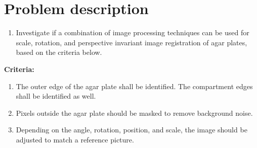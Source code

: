 \section{Problem description}
\begin{enumerate}
    \item Investigate if a combination of image processing techniques can be used for scale, rotation, and perspective invariant image registration of agar plates, based on the criteria below. 
    
\end{enumerate}
\textbf{Criteria:} 
\begin{enumerate}
    \item The outer edge of the agar plate shall be identified. The compartment edges shall be identified as well. 
    \item Pixels outside the agar plate should be masked to remove background noise.
    \item Depending on the angle, rotation, position, and scale, the image should be adjusted to match a reference picture.
\end{enumerate}




